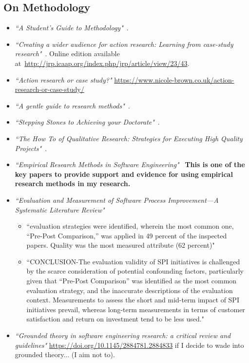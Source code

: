 \subsection{On Methodology}
\begin{itemize}
    \item \emph{``A Student's Guide to Methodology"}~\citep{clough2012_students_guide_to_methodology}.
    \item \emph{``Creating a wider audience for action research: Learning from case-study research"}~\citep{blichfeldt2006creating}. Online edition available at~\url{http://jrp.icaap.org/index.php/jrp/article/view/23/43}.
    \item \emph{``Action research or case study?"} \url{https://www.nicole-brown.co.uk/action-research-or-case-study/}
    \item \emph{``A gentle guide to research methods"}~\citep{rugg2006_gentle_guide_to_research_methods}.
    \item \emph{``Stepping Stones to Achieving your Doctorate"}~\citep{trafford2008_stepping_stones_to_achieving_your_doctorate}.
    \item \emph{``The How To of Qualitative Research: Strategies for Executing High Quality Projects"}~\citep{aurini2016_how_to_of_qualitative_research}.
    \item \emph{``Empirical Research Methods in Software Engineering"}~\citep{Wohlin2003_empirical_research_methods_in_software_engineering} \textbf{This is one of the key papers to provide support and evidence for using empirical research methods in my research.}
    \item \emph{``Evaluation and Measurement of Software Process Improvement—A Systematic Literature Review"}~\citep{unterkalmsteiner2012_evaluation_and_measurement_of_spi_a_slr}
    \begin{itemize}
        \item ``evaluation strategies were identified, wherein the most common one, “Pre-Post Comparison,” was applied in 49 percent of the inspected papers. Quality was the most measured attribute (62 percent)"
        \item ``CONCLUSION-The evaluation validity of SPI initiatives is challenged by the scarce consideration of potential confounding factors, particularly given that “Pre-Post Comparison” was identified as the most common evaluation strategy, and the inaccurate descriptions of the evaluation context. Measurements to assess the short and mid-term impact of SPI initiatives prevail, whereas long-term measurements in terms of customer satisfaction and return on investment tend to be less used."
    \end{itemize}
    \item \emph{``Grounded theory in software engineering research: a critical review and guidelines"} \url{https://doi.org/10.1145/2884781.2884833} if I decide to wade into grounded theory... (I aim not to).
\end{itemize}

